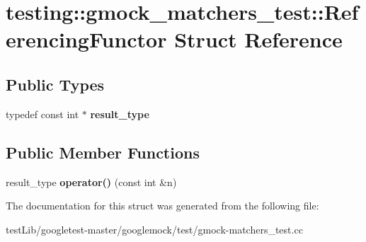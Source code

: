 \hypertarget{structtesting_1_1gmock__matchers__test_1_1ReferencingFunctor}{}\section{testing\+:\+:gmock\+\_\+matchers\+\_\+test\+:\+:Referencing\+Functor Struct Reference}
\label{structtesting_1_1gmock__matchers__test_1_1ReferencingFunctor}
\subsection*{Public Types}
\begin{DoxyCompactItemize}
\item 
\mbox{\label{structtesting_1_1gmock__matchers__test_1_1ReferencingFunctor_a5856a8175e2f797a6733a363b2834094}} 
typedef const int $\ast$ {\bfseries result\+\_\+type}
\end{DoxyCompactItemize}
\subsection*{Public Member Functions}
\begin{DoxyCompactItemize}
\item 
\mbox{\label{structtesting_1_1gmock__matchers__test_1_1ReferencingFunctor_a149f15ed9afbff28f5c3639c0f3eb255}} 
result\+\_\+type {\bfseries operator()} (const int \&n)
\end{DoxyCompactItemize}


The documentation for this struct was generated from the following file\+:\begin{DoxyCompactItemize}
\item 
test\+Lib/googletest-\/master/googlemock/test/gmock-\/matchers\+\_\+test.\+cc\end{DoxyCompactItemize}
